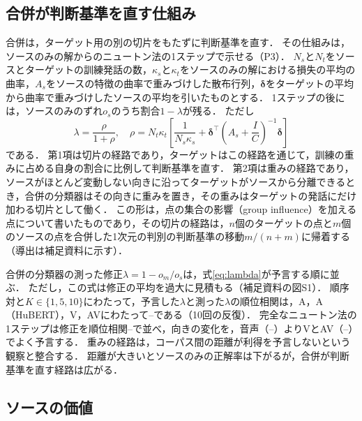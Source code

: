 \subsection{合併が判断基準を直す仕組み}
\label{sec:part1-pooling}

合併は，ターゲット用の別の切片をもたずに判断基準を直す．
その仕組みは，ソースのみの解からのニュートン法の1ステップで示せる（P3）．
$N_s$と$N_t$をソースとターゲットの訓練発話の数，$\kappa_s$と$\kappa_t$をソースのみの解における損失の平均の曲率，$A_s$をソースの特徴の曲率で重みづけした散布行列，$\boldsymbol{\delta}$をターゲットの平均から曲率で重みづけしたソースの平均を引いたものとする．
1ステップの後には，ソースのみのずれ$o_s$のうち割合$1 - \lambda$が残る．
ただし
\begin{equation}
\label{eq:lambda}
\lambda = \frac{\rho}{1 + \rho},\quad \rho = N_t\kappa_t\left[\frac{1}{N_s\kappa_s} + \boldsymbol{\delta}^{\top}\left(A_s + \frac{I}{C}\right)^{-1}\boldsymbol{\delta}\right]
\end{equation}
である．
第1項は切片の経路であり，ターゲットはこの経路を通じて，訓練の重みに占める自身の割合に比例して判断基準を直す．
第2項は重みの経路であり，ソースがほとんど変動しない向きに沿ってターゲットがソースから分離できるとき，合併の分類器はその向きに重みを置き，その重みはターゲットの発話にだけ加わる切片として働く．
この形は，点の集合の影響（group influence）\cite{koh2019accuracy,pregibon1981logistic}を加える点について書いたものであり，その切片の経路は，$n$個のターゲットの点と$m$個のソースの点を合併した1次元の判別の判断基準の移動$m/(n+m)$に帰着する\cite{desilva2023value}（導出は補足資料に示す）．

合併の分類器の測った修正$\lambda = 1 - o_m/o_s$は，式\eqref{eq:lambda}が予言する順に並ぶ．
ただし，この式は修正の平均を過大に見積もる（補足資料の図S1）．
順序対と$K \in \{1, 5, 10\}$にわたって，予言した$\lambda$と測った$\lambda$の順位相関は，A，A（HuBERT），V，AVにわたって--である（10回の反復）．
完全なニュートン法の1ステップは修正を順位相関--で並べ，向きの変化を，音声（--）よりVとAV（--）でよく予言する．
重みの経路は，コーパス間の距離が利得を予言しないという観察と整合する．
距離が大きいとソースのみの正解率は下がるが，合併が判断基準を直す経路は広がる．

\subsection{ソースの価値}
\label{sec:part1-value}

